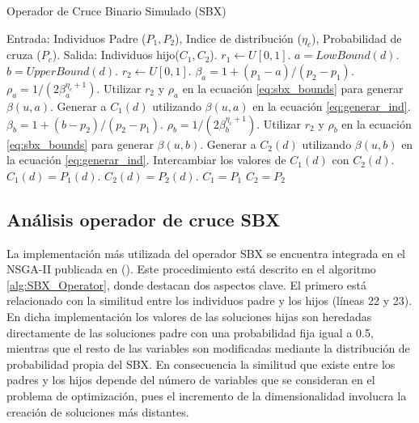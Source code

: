  \begin{algorithm}[H]
\scriptsize
\caption{Operador de Cruce Binario Simulado (SBX)}
\label{alg:SBX_Operator}
\begin{algorithmic}[1]
    \STATE Entrada: Individuos Padre ($P_1, P_2$), Indice de distribución ($\eta_c$), Probabilidad de cruza ($P_c$).
    \STATE Salida: Individuos hijo($C_1, C_2$).
    \STATE $r_1 \leftarrow U[0, 1]$.
		 \STATE $a = LowBound(d)$.	
		 \STATE $b = UpperBound(d)$.    
		 \STATE $ r_2 \leftarrow U[0, 1]$.
		 \STATE $\beta_a = 1 +(p_1 - a)/(p_2 - p_1)$.
		 \STATE $\rho_a = 1/(2 \beta_a^{\eta_c+1})$.
		 \STATE Utilizar $r_2$ y $\rho_a$ en la ecuación \ref{eq:sbx_bounds} para generar $\beta(u,a)$.  
		 \STATE Generar a $C_1(d)$ utilizando $\beta(u, a)$ en la ecuación \ref{eq:generar_ind}. 
		 \STATE $\beta_b = 1 +(b - p_2)/(p_2 - p_1)$.
		 \STATE $\rho_b = 1/(2 \beta_b^{\eta_c+1})$.
		 \STATE Utilizar $r_2$ y $\rho_b$ en la ecuación \ref{eq:sbx_bounds} para generar $\beta(u,b)$. 
		 \STATE Generar a $C_2(d)$ utilizando $\beta(u, b)$ en la ecuación \ref{eq:generar_ind}.
			 \STATE Intercambiar los valores de $C_1(d)$ con $C_2(d)$. 
		 \ENDIF 
        \ELSE 
	   \STATE $C_1(d) = P_1(d)$. 
	   \STATE $C_2(d) = P_2(d)$.
        \ENDIF 
       \ENDFOR
    \ELSE
	\STATE $C_1 = P_1$
	\STATE $C_2 = P_2$
    \ENDIF
\end{algorithmic}
\end{algorithm}


%
\subsection{Análisis operador de cruce SBX}

La implementación más utilizada del operador SBX se encuentra integrada en el NSGA-II publicada en (\cite{Joel:NSGAII}).
%
Este procedimiento está descrito en el algoritmo \ref{alg:SBX_Operator}, donde destacan dos aspectos clave.
%
El primero está relacionado con la similitud entre los individuos padre y los hijos (líneas 22 y 23).
%
En dicha implementación los valores de las soluciones hijas son heredadas directamente de las soluciones padre con una probabilidad 
fija igual a 0.5, mientras que el resto de las variables son modificadas mediante la distribución de probabilidad propia del SBX.
%
En consecuencia la similitud que existe entre los padres y los hijos depende del número de variables que se consideran en el 
problema de optimización, pues el incremento de la dimensionalidad involucra la creación de soluciones más distantes.

